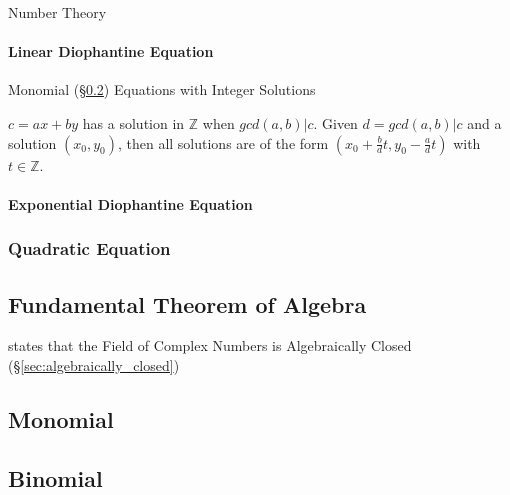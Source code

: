 \fist Number Theory



\paragraph{Linear Diophantine Equation}
\label{sec:linear_diophantine}\hfill

Monomial (\S\ref{sec:monomial}) Equations with Integer Solutions

$c = ax + by$ has a solution in $\mathbb{Z}$ when $gcd(a,b)|c$. Given
$d=gcd(a,b)|c$ and a solution $(x_0, y_0)$, then all solutions are of
the form $(x_0 + \frac{b}{d}t, y_0 - \frac{a}{d}t)$ with $t \in
\mathbb{Z}$.



\paragraph{Exponential Diophantine Equation}\hfill
\label{sec:exponential_diophantine}



\subsubsection{Quadratic Equation}\label{sec:quadratic_equation}



\subsection{Fundamental Theorem of Algebra}
\label{sec:fundamental_algebra_theorem}

states that the Field of Complex Numbers is Algebraically Closed
(\S\ref{sec:algebraically_closed})



\subsection{Monomial}\label{sec:monomial}

\subsection{Binomial}\label{sec:binomial}

